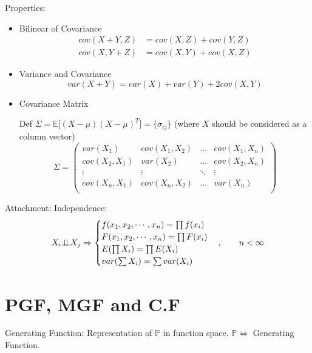     Properties:
\begin{itemize}
\item Bilinear of Covariance\begin{align}
    cov(X+Y,Z)&=cov(X,Z)+cov(Y,Z)\\
    cov(X,Y+Z)&=cov(X,Y)+cov(X,Z)
\end{align}
    
\item Variance and Covariance
\begin{equation}\label{EqaVarOfSumOfRV}
    var(X+Y)=var(X)+var(Y)+2cov(X,Y)
\end{equation}
\item Covariance Matrix

    Def $\Sigma=\mathbb{E}\big[(X-\mu)(X-\mu)^T\big]=\{\sigma_{ij}\}$ (where $X$ should be considered as a column vector)
\begin{equation}\label{covariancematrix}
    \Sigma=
        \begin{pmatrix}
        var(X_1) & cov(X_1,X_2) & \ldots & cov(X_1,X_n)\\
        cov(X_2,X_1) & var(X_2) & \ldots & cov(X_2,X_n)\\
        \vdots & \vdots & \ddots & \vdots\\
        cov(X_n,X_1) & cov(X_n,X_2) & \ldots & var(X_n)\\
        \end{pmatrix}    
    \end{equation}
\end{itemize}

Attachment: Independence:\begin{equation}    X_i \bot\!\!\!\bot X_j\Rightarrow \begin{cases}
        f(x_1,x_2,\cdots,x_n)=\prod f(x_i)\\
        F(x_1,x_2,\cdots,x_n)=\prod F(x_i)\\
        E(\prod X_i)=\prod E(X_i)\\
        var(\sum X_i)=\sum var(X_i)
    \end{cases},\qquad n<\infty
\end{equation}


\section{PGF, MGF and C.F}\label{SectionPGFMGFCF}

    Generating Function: Representation of $\mathbb{P}$ in function space. $\mathbb{P}\Leftrightarrow$ Generating Function.

